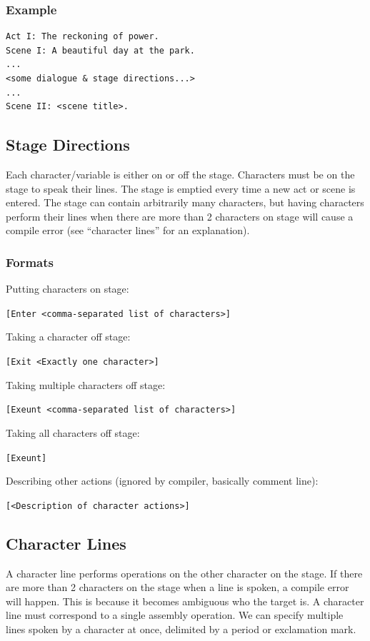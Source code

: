 \documentclass[11pt]{article}
\begin{document}
\subsubsection{Example}
\begin{verbatim}
Act I: The reckoning of power.
Scene I: A beautiful day at the park.
...
<some dialogue & stage directions...>
...
Scene II: <scene title>.
\end{verbatim}

\subsection{Stage Directions}

Each character/variable is either on or off the stage. Characters must be on the stage to speak their lines. The stage is emptied every time a new act or scene is entered. The stage can contain arbitrarily many characters, but having characters perform their lines when there are more than 2 characters on stage will cause a compile error (see “character lines” for an explanation).

\subsubsection{Formats}

Putting characters on stage:

\verb|[Enter <comma-separated list of characters>]|

Taking a character off stage:

\verb|[Exit <Exactly one character>]|

Taking multiple characters off stage:

\verb|[Exeunt <comma-separated list of characters>]|

Taking all characters off stage:

\verb|[Exeunt]|

Describing other actions (ignored by compiler, basically comment line):

\verb|[<Description of character actions>]|

\subsection{Character Lines}

A character line performs operations on the other character on the stage. If there are more than 2 characters on the stage when a line is spoken, a compile error will happen. This is because it becomes ambiguous who the target is. A character line must correspond to a single assembly operation. We can specify multiple lines spoken by a character at once, delimited by a period or exclamation mark.
\end{document}
